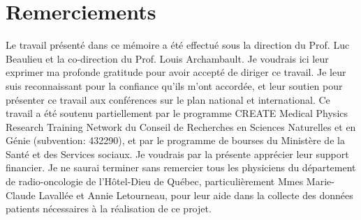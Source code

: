 \chapter*{Remerciements}         %
%
Le travail présenté dans ce mémoire a été effectué sous la direction du Prof. Luc Beaulieu et la co-direction du Prof. Louis Archambault. Je voudrais ici leur exprimer ma profonde gratitude pour avoir accepté de diriger ce travail. Je leur suis reconnaissant pour la confiance qu'ils m'ont accordée, et leur soutien pour présenter ce travail aux conférences sur le plan national et international.\newline
\newline
%
Ce travail a été soutenu partiellement  par le programme CREATE Medical Physics Research Training Network du Conseil de Recherches en Sciences Naturelles et en Génie (subvention: 432290), et par le programme de bourses du Ministère de la Santé et des Services sociaux. Je voudrais par la présente apprécier leur support financier.\newline
\newline
%
Je ne saurai terminer sans remercier tous les physiciens du département de radio-oncologie de l'Hôtel-Dieu de Québec, particulièrement Mmes Marie-Claude Lavallée et Annie Letourneau, pour leur aide dans la collecte des données patients nécessaires à la réalisation de ce projet.
